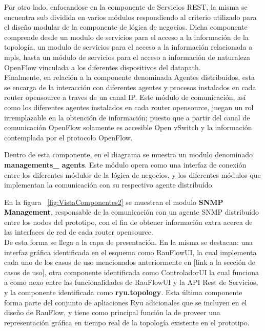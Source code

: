 Por otro lado, enfocandose en la componente de Servicios REST, la misma se encuentra sub dividida en varios m\'odulos respondiendo al criterio utilizado para el dise\~no modular de la componente de l\'ogica de negocios. Dicha componente comprende desde un modulo de servicios para el acceso a la informaci\'on de la topolog\'ia, un modulo de servicios para el acceso a la informaci\'on relacionada a mpls, hasta un m\'odulo de servicios para el acceso a informaci\'on de naturaleza OpenFlow vinculada a los diferentes dispositivos del datapath.\\

Finalmente, en relaci\'on a la componente denominada Agentes distribu\'idos, esta se encarga de la interacci\'on con diferentes agentes y procesos instalados en cada router opensource a traves de un canal IP. Este m\'odulo de comunicaci\'on, as\'i como los diferentes agentes instalados en cada router opensource, juegan un rol irremplazable en la obtenci\'on de informaci\'on; puesto que a partir del canal de comunicaci\'on OpenFlow solamente es accesible Open vSwitch y la informaci\'on contemplada por el protocolo OpenFlow.

Dentro de esta componente, en el diagrama se muestra un modulo denominado \textbf{managements\_ agents}. Este m\'odulo opera como una interfaz de conexi\'on entre los diferentes m\'odulos de la l\'ogica de negocios, y los diferentes m\'odulos que implementan la comunicaci\'on con su respectivo agente distribu\'ido.

En la figura ~\ref{fig:VistaComponentes2} se muestran el modulo \textbf{SNMP Management}, responsable de  la comunicaci\'on con un agente SNMP distribu\'ido entre los nodos del prototipo, con el fin de obtener informaci\'on extra acerca de las interfaces de red de cada router opensource.\\

De esta forma se llega a la capa de presentaci\'on. En la misma se destacan: una interfaz gr\'afica identificada en el esquema como RauFlowUI, la cual implementa cada uno de los casos de uso mencionados anteriormente en [link a la secci\'on de casos de uso], otra componente identificada como ControladorUI la cual funciona a como nexo entre las funcionalidades de RauFlowUI y la API Rest de Servicios, y la componente identificada como \textbf{ryu.topology}. Esta \'ultima componente forma parte del conjunto de apliaciones Ryu adicionales que se incluyen en el dise\~no de RauFlow, y tiene como principal funci\'on la de proveer una representaci\'on gr\'afica en tiempo real de la topolog\'ia existente en el prototipo.\\

